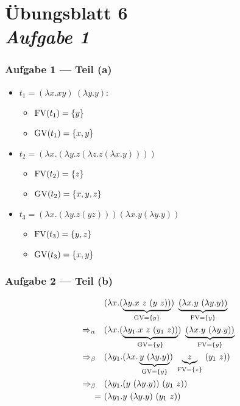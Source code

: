 \documentclass{beamer}
\DeclareMathOperator{\GV}{GV}
\DeclareMathOperator{\FV}{FV}
\begin{document}
\section{Übungsblatt 6 \\ \textit{\normalsize Aufgabe 1}}

\begin{frame} \frametitle{Aufgabe 1 --- Teil (a)}
	\begin{itemize}[<+->]
		\item $t_1 = (\lambda x . x y) \ (\lambda y . y)$:
			\begin{itemize}
				\item $\FV(t_1) = \menge{y}$
				 \item $\GV(t_1) = \menge{x,y}$
			\end{itemize}
		\item $t_2 = (\lambda x . (\lambda y . z (\lambda z . z (\lambda x . y))))$
			\begin{itemize}
				\item $\FV(t_2) = \menge{z}$
				\item $\GV(t_2) = \menge{x,y,z}$
			\end{itemize}
		\item $t_3 = (\lambda x . (\lambda y . z (yz)))(\lambda x . y (\lambda y. y ))$
			\begin{itemize}
				\item $\FV(t_3) = \menge{y,z}$
				\item $\GV(t_3) = \menge{x,y}$
			\end{itemize}
	\end{itemize}
\end{frame}

\begin{frame} \frametitle{Aufgabe 2 --- Teil (b)}
	\begin{align*}
		&(\lambda x . (\underbrace{\lambda y . x \ z \ (y \ z))}_{\GV=\menge{y}}) \ \underbrace{(\lambda x . y \ (\lambda y . y))}_{\FV = \menge{y}}
		\\
		\Rightarrow_\alpha \quad
		& (\lambda x . (\underbrace{\lambda y_1 . x \ z \ (y_1 \ z))}_{\GV=\menge{y}}) \ \underbrace{(\lambda x . y \ (\lambda y . y))}_{\FV = \menge{y}}
		\\
		\Rightarrow_\beta \quad
		& (\lambda y_1 . (\lambda x . \underbrace{y \ (\lambda y . y)}_{\GV= \menge{y}}) \ \underbrace{z}_{\FV = \menge{z}} \ (y_1 \ z))
		\\
		\Rightarrow_\beta \quad
		& (\lambda y_1 . (y \ (\lambda y . y)) \ (y_1 \ z))
		\\
		= \ & (\lambda y_1 . y \ (\lambda y . y) \ (y_1 \ z))
	\end{align*}
\end{frame}
\end{document}
